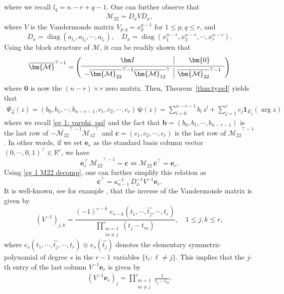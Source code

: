 \documentclass[a4paper,10pt,leqno]{amsart}
\numberwithin{equation}{section}
\theoremstyle{remark}
\newcommand{\R}{\mathbb{R}}
\begin{document}
where we recall $l_q = n-r+q-1$. One can further observe that
\begin{align} \label{eg 1 M22 decomp}
    \bm{\mathcal{M}}_{22} = D_a V D_x,
\end{align}
where $V$ is the Vandermonde matrix $V_{p,q} = x_{p}^{q-1}$ for $1 \leq p, q \leq r$, and 
\[
D_a = \operatorname{diag}(a_{l_1}, a_{l_2}, \cdots, a_{l_r}), \quad D_x = \operatorname{diag}(x_1^{n-r}, x_2^{n-r}, \cdots, x_r^{n-r}).
\]
Using the block structure of $\bm{\mathcal{M}}$, it can be readily shown that
\[
\overline{\bm{\mathcal{M}}}^{\top-1} = \begin{pmatrix}
\begin{array}{c|c}
    \bm I      & \bm{0} \\
    \noalign{\vskip 2pt\hrule\vskip 2pt}
    -\overline{\bm{\mathcal{M}}_{22}}^{\top-1} \overline{\bm{\mathcal{M}}_{12}}^{\top} & \overline{\bm{\mathcal{M}}_{22}}^{\top-1}
\end{array}
\end{pmatrix}
\]
where $\bm{0}$ is now the $(n-r) \times r$ zero matrix. 
Then, Theorem~\ref{thm:typeI} yields that 
\begin{align} \label{eg 1 expression 2}
\Psi_{\vec{n}}(z) = (b_0, b_1, \cdots, b_{n-r-1}, c_1, c_2, \cdots, c_r) \, \bm{\psi}(z) = \sum_{l = 0}^{n-r-1} b_l \, z^l +  \sum_{j=1}^r c_j \mathbf{1}_{E_j}(\arg z) 
\end{align}
where we recall \eqref{eg 1: varphi, psi} and the fact that $\bm{b} = (b_0, b_1, \cdots, b_{n-r-1})$ is the last row of $-\overline{\bm{\mathcal{M}}_{22}}^{\top-1} \overline{\bm{\mathcal{M}}_{12}}^{\top}$ and $\bm{c} = (c_1, c_2, \cdots, c_r)$ is the last row of $\overline{\bm{\mathcal{M}}_{22}}^{\top-1}$.
In other words, if we set $\bm{e}_r$ as the standard basis column vector $(0, \cdots, 0, 1)^\top \in \R^r$, we have
\[
\bm{e}_r^\top \, \overline{\bm{\mathcal{M}}_{22}}^{\top-1} = \bm{c} \iff \bm{\mathcal{M}}_{22} \, \overline{\bm{c}}^\top = \bm{e}_r.
\]
Using \eqref{eg 1 M22 decomp}, one can further simplify this relation as
\begin{equation}\label{eq:c-with-vand}
\overline{\bm{c}}^\top = a_{n-1}^{-1} \, D_x^{-1} V^{-1} \bm{e}_r.
\end{equation}
It is well-known, see for example \cite{Klinger}, that the inverse of the Vandermonde matrix is given by
\begin{equation} \label{eq:Vinv_entry}
(V^{-1})_{j,k} = \frac{(-1)^{r-k}\; e_{r-k} \left(t_1,\cdots,\widehat{t_j},\cdots,t_r \right)}
{\displaystyle\prod_{\substack{m=1 \\ m \neq j}}^r (t_j - t_m)},\quad 1\leq j,k \leq r,
\end{equation}
where $e_s(t_1,\cdots,\widehat{t_j},\cdots,t_r) \equiv e_s(\widehat{t_j})$ denotes the elementary symmetric polynomial of degree $s$ in the $r-1$ variables $\{t_\ell:\ell\neq j\}$.
This implies that the $j$-th entry of the last column $V^{-1} \bm{e}_r$ is given by
\begin{align} \label{last column of inv V}
(V^{-1} \bm{e}_r)_j = \prod_{\substack{m=1 \\ m \neq j}}^r \frac{1}{t_j - t_m}.
\end{align}
\end{document}
